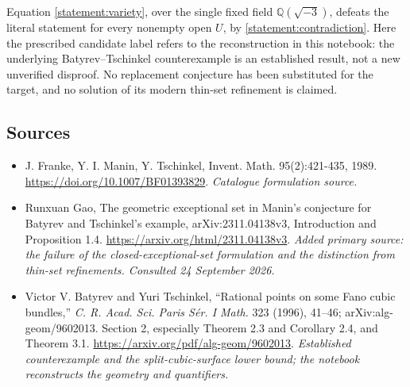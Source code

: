 \documentclass[11pt,a4paper]{article}
\newcommand{\Q}{\mathbb{Q}}
\numberwithin{equation}{section}
\begin{document}
Equation \eqref{statement:variety}, over the single fixed field
$\Q(\sqrt{-3})$, defeats the literal statement for every nonempty open
$U$, by \eqref{statement:contradiction}. Here the prescribed candidate label
refers to the reconstruction in this notebook: the underlying
Batyrev--Tschinkel counterexample is an established result, not a new
unverified disproof. No replacement conjecture has been substituted for
the target, and no solution of its modern thin-set refinement is claimed.

\subsection{Sources}
\begin{itemize}\raggedright
\item[\textnormal{[S1]}]\hypertarget{source:statement:1}{} J. Franke, Y. I. Manin, Y. Tschinkel, Invent. Math. 95(2):421-435, 1989.
\url{https://doi.org/10.1007/BF01393829}.
{\small\textit{Catalogue formulation source.}}
\item[\textnormal{[E1]}]\hypertarget{extra:statement:1}{} Runxuan Gao, The geometric exceptional set in Manin's conjecture for Batyrev and Tschinkel's example, arXiv:2311.04138v3, Introduction and Proposition 1.4.
\url{https://arxiv.org/html/2311.04138v3}.
{\small\textit{Added primary source: the failure of the closed-exceptional-set formulation and the distinction from thin-set refinements. Consulted 24 September 2026.}}
\item[\textnormal{[E2]}]\hypertarget{extra:statement:2}{} Victor V. Batyrev and Yuri Tschinkel, ``Rational points on some Fano cubic bundles,'' \emph{C. R. Acad. Sci. Paris S\'er. I Math.} 323 (1996), 41--46; arXiv:alg-geom/9602013. Section 2, especially Theorem 2.3 and Corollary 2.4, and Theorem 3.1.
\url{https://arxiv.org/pdf/alg-geom/9602013}.
{\small\textit{Established counterexample and the split-cubic-surface lower bound; the notebook reconstructs the geometry and quantifiers.}}
\end{itemize}
\end{document}
